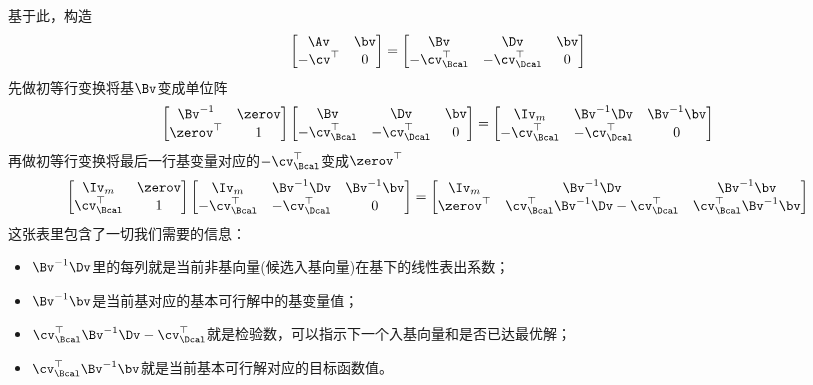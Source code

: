 \documentclass{ctexart}
\begin{document}
基于此，构造
\begin{align*}
    \begin{bmatrix}
        \Av & \bv \\ -\cv^\top & 0
    \end{bmatrix} =
    \begin{bmatrix}
        \Bv & \Dv & \bv \\ -\cv_\Bcal^\top & -\cv_\Dcal^\top & 0
    \end{bmatrix}
\end{align*}
先做初等行变换将基$\Bv$变成单位阵
\begin{align*}
    \begin{bmatrix}
        \Bv^{-1} & \zerov \\ \zerov^\top & 1
    \end{bmatrix}
    \begin{bmatrix}
        \Bv & \Dv & \bv \\ -\cv_\Bcal^\top & -\cv_\Dcal^\top & 0
    \end{bmatrix} =
    \begin{bmatrix}
        \Iv_m & \Bv^{-1} \Dv & \Bv^{-1} \bv \\ -\cv_\Bcal^\top & -\cv_\Dcal^\top & 0
    \end{bmatrix}
\end{align*}
再做初等行变换将最后一行基变量对应的$-\cv_\Bcal^\top$变成$\zerov^\top$
\begin{align*}
    \begin{bmatrix}
        \Iv_m & \zerov \\ \cv_\Bcal^\top & 1
    \end{bmatrix}
    \begin{bmatrix}
        \Iv_m & \Bv^{-1} \Dv & \Bv^{-1} \bv \\ -\cv_\Bcal^\top & -\cv_\Dcal^\top & 0
    \end{bmatrix} =
    \begin{bmatrix}
        \Iv_m & \Bv^{-1} \Dv & \Bv^{-1} \bv \\ \zerov^\top & \cv_\Bcal^\top \Bv^{-1} \Dv - \cv_\Dcal^\top & \cv_\Bcal^\top \Bv^{-1} \bv
    \end{bmatrix}
\end{align*}
这张表里包含了一切我们需要的信息：
\begin{itemize}
    \item $\Bv^{-1} \Dv$里的每列就是当前非基向量(候选入基向量)在基下的线性表出系数；
    \item $\Bv^{-1} \bv$是当前基对应的基本可行解中的基变量值；
    \item $\cv_\Bcal^\top \Bv^{-1} \Dv - \cv_\Dcal^\top$就是检验数，可以指示下一个入基向量和是否已达最优解；
    \item $\cv_\Bcal^\top \Bv^{-1} \bv$就是当前基本可行解对应的目标函数值。
\end{itemize}
\end{document}
